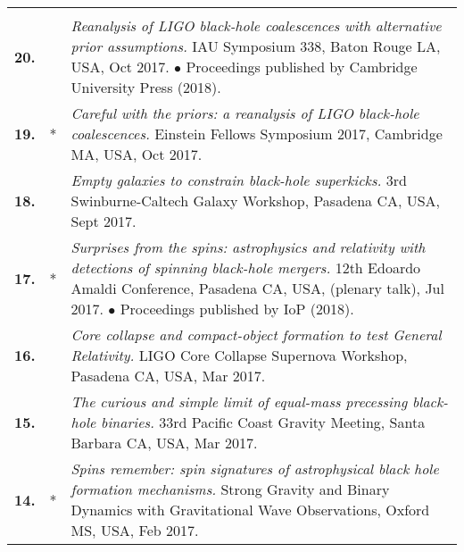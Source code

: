 {\begin{longtable}{rp{0.3cm}p{15.8cm}}
\vspace{0.05cm}\\
%
\textbf{20.} &  & \textit{Reanalysis of LIGO black-hole coalescences with alternative prior assumptions.}
\newline{}
 IAU Symposium 338, Baton Rouge LA, USA, Oct 2017.
\newline{}
\textcolor{color1}{$\bullet$} Proceedings published by Cambridge University Press (2018).
\vspace{0.05cm}\\
%
\textbf{19.} & * & \textit{Careful with the priors: a reanalysis of LIGO black-hole coalescences.}
\newline{}
 Einstein Fellows Symposium 2017, Cambridge MA, USA, Oct 2017.
\vspace{0.05cm}\\
%
\textbf{18.} &  & \textit{Empty galaxies to constrain black-hole superkicks.}
\newline{}
 3rd Swinburne-Caltech Galaxy Workshop, Pasadena CA, USA, Sept 2017.
\vspace{0.05cm}\\
%
\textbf{17.} & * & \textit{Surprises from the spins: astrophysics and relativity with detections of spinning black-hole mergers.}
\newline{}
12th Edoardo Amaldi Conference, Pasadena CA, USA, (plenary talk), Jul 2017.
\newline{}
\textcolor{color1}{$\bullet$} Proceedings published by IoP (2018).
\vspace{0.05cm}\\
%
\textbf{16.} &  & \textit{Core collapse and compact-object formation to test General Relativity.}
\newline{}
LIGO Core Collapse Supernova Workshop, Pasadena CA, USA, Mar 2017.
\vspace{0.05cm}\\
%
\textbf{15.} &  & \textit{The curious and simple limit of equal-mass precessing black-hole binaries.}
\newline{}
33rd Pacific Coast Gravity Meeting, Santa Barbara CA, USA, Mar 2017.
\vspace{0.05cm}\\
%
\textbf{14.} & * & \textit{Spins remember: spin signatures of astrophysical black hole formation mechanisms.}
\newline{}
Strong Gravity and Binary Dynamics with Gravitational Wave Observations, Oxford MS, USA, Feb 2017.
\vspace{0.05cm}\\

\end{longtable}}
